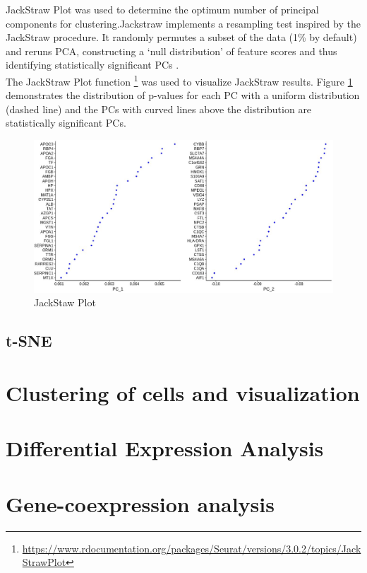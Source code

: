 \documentclass{sydneythesis}
\begin{document}
JackStraw Plot was used to determine the optimum number of principal
components for clustering.Jackstraw implements a resampling test
inspired by the JackStraw procedure. It randomly permutes a subset of
the data (1\% by default) and reruns PCA, constructing a `null
distribution' of feature scores and thus identifying statistically
significant PCs \autocite{chung2018jackstraw}.\\
The JackStraw Plot function
\footnote{\url{https://www.rdocumentation.org/packages/Seurat/versions/3.0.2/topics/JackStrawPlot}}
was used to visualize JackStraw results. Figure \ref{fig:figa}
demonstrates the distribution of p-values for each PC with a uniform
distribution (dashed line) and the PCs with curved lines above the
distribution are statistically significant PCs.

\begin{figure}[H]
  \includegraphics[scale=0.4]{pcloadliver.JPG}
  \caption{JackStaw Plot}
  \label{fig:figa}
\end{figure}

\subsection{t-SNE}\label{t-sne}

\section{Clustering of cells and
visualization}\label{clustering-of-cells-and-visualization}

\section{Differential Expression
Analysis}\label{differential-expression-analysis}

\section{Gene-coexpression analysis}\label{gene-coexpression-analysis}
\end{document}
